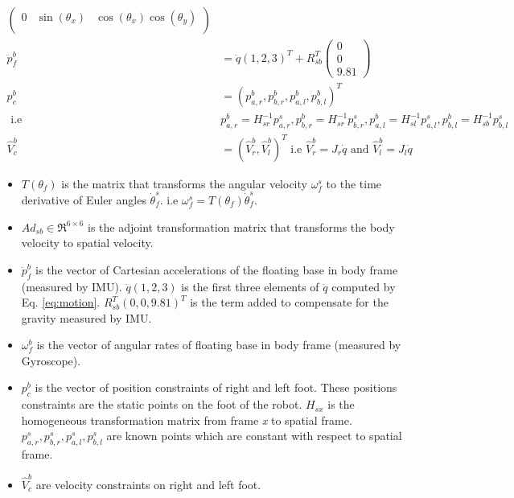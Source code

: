 \documentclass[12pt]{article}
\begin{document}
\begin{equation}
\begin{split}
\begin{pmatrix}
	0 &\sin(\theta_{x}) &\cos(\theta_{x})\cos(\theta_{y})\\
	\end{pmatrix}	\\
	\ddot{p}_{f}^{b} &= \ddot{q}(1,2,3)^{T} + R_{sb}^{T} 
	\begin{pmatrix}
	0 \\ 0 \\ 9.81
	\end{pmatrix}\\
	p_{c}^{b} &= (p_{a,r}^{b}, p_{b,r}^{b}, p_{a,l}^{b}, p_{b,l}^{b} )^{T} \\
	 \text{ i.e } &p_{a,r}^{b} = H_{sr}^{-1} p_{a,r}^{s},p_{b,r}^{b} = H_{sr}^{-1} p_{b,r}^{s},p_{a,l}^{b} = H_{sl}^{-1} p_{a,l}^{s},p_{b,l}^{b} = H_{sb}^{-1} p_{b,l}^{s}  \\
	\hat{V}_{c}^{b} &= (\hat{V}_{r}^{b},\hat{V}_{l}^{b})^{T} \text{ i.e } \hat{V}_{r}^{b} = J_{r}\dot{q} \text{ and } \hat{V}_{l}^{b} = J_{l}\dot{q}
	\end{split}
	\end{equation}
\begin{itemize}
\item $T(\theta_{f})$ is the matrix that transforms the angular velocity $\omega_{f}^{s}$ to the time derivative of Euler angles $\dot{\theta}_{f}^{s}$. i.e $\omega_{f}^{s}=T(\theta_{f}) \dot{\theta}_{f}^{s}$. 
\item $Ad_{sb} \in \Re^{6 \times 6}$ is the adjoint transformation matrix that transforms the body velocity to spatial velocity. 
\item $\ddot{p}_{f}^{b}$ is the vector of Cartesian accelerations of the floating base in body frame (measured by IMU).	$\ddot{q}(1,2,3)$ is the first three elements of $\ddot{q}$ computed by Eq. \ref{eq:motion}. $R_{sb}^{T}(0,0,9.81)^{T}$ is the term added to compensate for the gravity measured by IMU. 
\item $\omega_{f}^{b} $ is the vector of angular rates of floating base in body frame (measured by Gyroscope). 
\item $p_{c}^{b}$ is the vector of position constraints of right and left foot. These positions constraints are the static points on the foot of the robot. $H_{sx}$ is the homogeneous transformation matrix from frame \emph{x} to spatial frame. $p_{a,r}^{s}, p_{b,r}^{s}, p_{a,l}^{s}, p_{b,l}^{s}$ are known points which are constant with respect to spatial frame.
\item $\hat{V}_{c}^{b}$ are velocity constraints on right and left foot.
\end{itemize}
\end{document}
